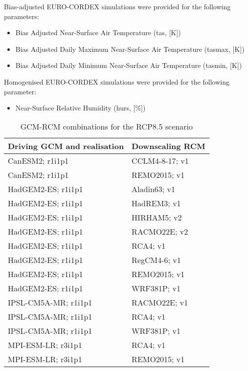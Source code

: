 \documentclass[a4paper, 11pt]{scrartcl}
\begin{document}
Bias-adjusted EURO-CORDEX simulations were provided for the following parameters:
\begin{itemize}
\item Bias Adjusted Near-Surface Air Temperature (tas, [K])
\item Bias Adjusted Daily Maximum Near-Surface Air Temperature (tasmax, [K])
\item Bias Adjusted Daily Minimum Near-Surface Air Temperature (tasmin, [K])
\end{itemize}

Homogenised EURO-CORDEX simulations were provided for the following parameter:
\begin{itemize}
\item Near-Surface Relative Humidity (hurs, [\%])
\end{itemize}


\begin{table}[h!]
\caption{GCM-RCM combinations for the RCP8.5 scenario}
\label{tab:climate_models}
\begin{tabularx}{\textwidth}{@{}ll@{}}
\toprule
\textbf{Driving GCM and realisation}  & \textbf{Downscaling RCM} 	\\
\midrule
CanESM2; r1i1p1 				 	  & CCLM4-8-17; v1  		 	\\
CanESM2; r1i1p1 				 	  & REMO2015; v1 				\\
HadGEM2-ES; r1i1p1 					  & Aladin63; v1 				\\
HadGEM2-ES; r1i1p1 					  & HadREM3; v1 				\\
HadGEM2-ES; r1i1p1 					  & HIRHAM5; v2 				\\
HadGEM2-ES; r1i1p1 					  & RACMO22E; v2 				\\
HadGEM2-ES; r1i1p1 					  & RCA4; v1 					\\
HadGEM2-ES; r1i1p1 					  & RegCM4-6; v1 				\\
HadGEM2-ES; r1i1p1 					  & REMO2015; v1 				\\
HadGEM2-ES; r1i1p1 					  & WRF381P; v1 				\\
IPSL-CM5A-MR; r1i1p1 				  & RACMO22E; v1 				\\
IPSL-CM5A-MR; r1i1p1 				  & RCA4; v1 					\\
IPSL-CM5A-MR; r1i1p1 				  & WRF381P; v1 				\\
MPI-ESM-LR; r3i1p1 					  & RCA4; v1 					\\
MPI-ESM-LR; r3i1p1 					  & REMO2015; v1 				\\
\bottomrule
\end{tabularx}
\end{table}
\end{document}
